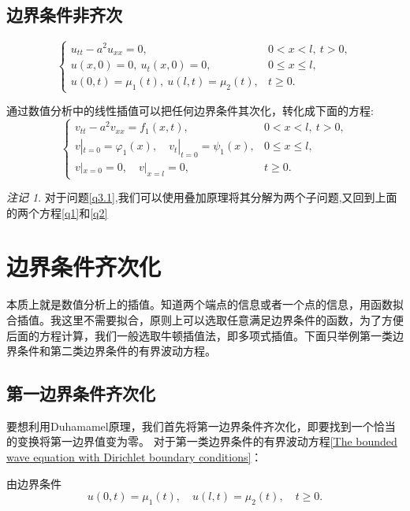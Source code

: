 \documentclass[12pt,a4paper]{article}
\numberwithin{subsection}{section}   %
\numberwithin{subsubsection}{subsection}
\theoremstyle{plain}
\theoremstyle{definition}
\theoremstyle{remark}
\newtheorem{remark}[theorem]{注记}
\theoremstyle{remark}
\begin{document}
	
	\subsection{边界条件非齐次}
	\begin{equation}\label{q3}
		\begin{cases}
			u_{tt} - a^2 u_{xx} = 0, & 0 < x < l, \ t > 0, \\
			u(x, 0) = 0, \ u_t(x, 0) = 0, & 0 \leq x \leq l, \\
			u(0, t) = \mu_1(t), \ u(l, t) = \mu_2(t), & t \geq 0.
		\end{cases}
	\end{equation}	
	
	通过数值分析中的线性插值可以把任何边界条件其次化，转化成下面的方程:
	\begin{equation}\label{q3.1}
	\begin{cases}
		v_{tt} - a^2 v_{xx} = f_1(x, t), & 0 < x < l, \ t > 0, \\
		v|_{t=0} = \varphi_1(x), \quad v_t|_{t=0} = \psi_1(x), & 0 \leq x \leq l, \\
		v|_{x=0} = 0, \quad v|_{x=l} = 0, & t \geq 0.
	\end{cases}
\end{equation}
	
	
	\begin{remark}
	对于问题\eqref{q3.1},我们可以使用叠加原理将其分解为两个子问题,又回到上面的两个方程\eqref{q1}和\eqref{q2}
\end{remark}

	

	
	\newpage
	
		\section{边界条件齐次化}
		本质上就是数值分析上的插值。知道两个端点的信息或者一个点的信息，用函数拟合插值。我这里不需要拟合，原则上可以选取任意满足边界条件的函数，为了方便后面的方程计算，我们一般选取牛顿插值法，即多项式插值。下面只举例第一类边界条件和第二类边界条件的有界波动方程。
	\subsection{第一边界条件齐次化}
	要想利用Duhamamel原理，我们首先将第一边界条件齐次化，即要找到一个恰当的变换将第一边界值变为零。
	对于第一类边界条件的有界波动方程\eqref{The bounded wave equation with Dirichlet boundary conditions}：
	
	由边界条件
	\begin{equation}
		u(0,t) = \mu_1(t), \quad u(l,t) = \mu_2(t), \quad t \geq 0.
	\end{equation}
	
\end{document}
